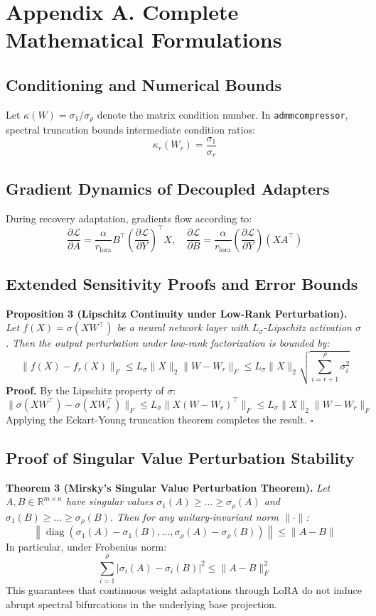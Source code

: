 \section*{Appendix A. Complete Mathematical Formulations}

\subsection*{Conditioning and Numerical Bounds}
Let $\kappa(W) = \sigma_1 / \sigma_\rho$ denote the matrix condition number. In \texttt{admmcompressor}, spectral truncation bounds intermediate condition ratios:
\[
\kappa_r(W_r) = \frac{\sigma_1}{\sigma_r}
\]

\subsection*{Gradient Dynamics of Decoupled Adapters}
During recovery adaptation, gradients flow according to:
\[
\frac{\partial \mathcal{L}}{\partial A} = \frac{\alpha}{r_{\text{lora}}} B^\top \left( \frac{\partial \mathcal{L}}{\partial Y} \right)^\top X, \quad \frac{\partial \mathcal{L}}{\partial B} = \frac{\alpha}{r_{\text{lora}}} \left( \frac{\partial \mathcal{L}}{\partial Y} \right) (X A^\top)
\]

\subsection*{Extended Sensitivity Proofs and Error Bounds}
\textbf{Proposition 3 (Lipschitz Continuity under Low-Rank Perturbation).} \textit{Let $f(X) = \sigma(X W^\top)$ be a neural network layer with $L_\sigma$-Lipschitz activation $\sigma$. Then the output perturbation under low-rank factorization is bounded by:}
\[
\|f(X) - f_r(X)\|_F \le L_\sigma \|X\|_2 \|W - W_r\|_F \le L_\sigma \|X\|_2 \sqrt{\sum_{i=r+1}^\rho \sigma_i^2}
\]
\textbf{Proof.} By the Lipschitz property of $\sigma$:
\[
\|\sigma(X W^\top) - \sigma(X W_r^\top)\|_F \le L_\sigma \|X (W - W_r)^\top\|_F \le L_\sigma \|X\|_2 \|W - W_r\|_F
\]
Applying the Eckart-Young truncation theorem completes the result. $\square$

\subsection*{Proof of Singular Value Perturbation Stability}
\textbf{Theorem 3 (Mirsky's Singular Value Perturbation Theorem).} \textit{Let $A, B \in \mathbb{R}^{m \times n}$ have singular values $\sigma_1(A) \ge \dots \ge \sigma_\rho(A)$ and $\sigma_1(B) \ge \dots \ge \sigma_\rho(B)$. Then for any unitary-invariant norm $\|\cdot\|$:}
\[
\left\| \operatorname{diag}(\sigma_1(A) - \sigma_1(B), \dots, \sigma_\rho(A) - \sigma_\rho(B)) \right\| \le \|A - B\|
\]
In particular, under Frobenius norm:
\[
\sum_{i=1}^\rho |\sigma_i(A) - \sigma_i(B)|^2 \le \|A - B\|_F^2
\]
This guarantees that continuous weight adaptations through LoRA do not induce abrupt spectral bifurcations in the underlying base projection.

